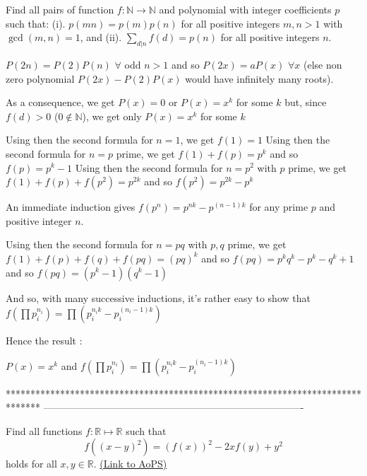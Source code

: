 \begin{solution}
	\begin{tcolorbox}Find all pairs of function $ f: \mathbb{N} \rightarrow \mathbb{N}$ and polynomial with integer coefficients $ p$ such that:
(i). $ p(mn) = p(m)p(n)$ for all positive integers $ m,n > 1$ with $ \gcd(m,n) = 1$, and
(ii). $ \sum_{d|n}f(d) = p(n)$ for all positive integers $ n$.\end{tcolorbox}

$ P(2n)=P(2)P(n)$ $ \forall$ odd $ n>1$ and so $ P(2x)=aP(x)$ $ \forall x$ (else non zero polynomial $ P(2x)-P(2)P(x)$ would have infinitely many roots).

As a consequence, we get $ P(x)=0$ or $ P(x)=x^k$ for some $ k$ but, since $ f(d)>0$ ($ 0\notin\mathbb N$), we get only $ P(x)=x^k$ for some $ k$ 

Using then the second formula for $ n=1$, we get $ f(1)=1$
Using then the second formula for $ n=p$ prime, we get $ f(1)+f(p)=p^k$ and so $ f(p)=p^k-1$
Using then the second formula for $ n=p^2$ with $ p$ prime, we get $ f(1)+f(p)+f(p^2)=p^{2k}$ and so $ f(p^2)=p^{2k}-p^k$

An immediate induction gives $ f(p^n)=p^{nk}-p^{(n-1)k}$ for any prime $ p$ and positive integer $ n$.

Using then the second formula for $ n=pq$ with $ p,q$ prime, we get $ f(1)+f(p)+f(q)+f(pq)=(pq)^k$ and so $ f(pq)=p^kq^k-p^k-q^k+1$ and so $ f(pq)=(p^k-1)(q^k-1)$

And so, with many successive inductions, it's rather easy to show that $ f(\prod p_i^{n_i})=\prod(p_i^{n_ik}-p_i^{(n_i-1)k})$

Hence the result :

$ P(x)=x^k$ and $ f(\prod p_i^{n_i})=\prod(p_i^{n_ik}-p_i^{(n_i-1)k})$
\end{solution}
*******************************************************************************
-------------------------------------------------------------------------------

\begin{problem}
	Find all functions $ f : \mathbb{R}\mapsto\mathbb{R}$ such that \[ f((x - y)^2)=(f(x))^2 -2xf(y)+y^2\] holds for all $x,y \in \mathbb R$.
	\flushright \href{https://artofproblemsolving.com/community/c6h312141}{(Link to AoPS)}
\end{problem}



